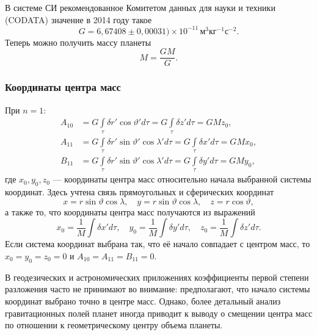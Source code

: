 \documentclass[11pt, a4paper,addpoints]{exam}
\theoremstyle{remark}
\renewcommand{\theta}{\vartheta}
\begin{document}
    В системе СИ рекомендованное Комитетом данных для науки и техники (CODATA) значение в 2014 году\cite{CODATA2014} такое
    \begin{equation*}
        G = 6,67408 \pm 0,00031)\times10^{-11}\,\text{м}^3\text{кг}^{-1}\text{с}^{-2}.
    \end{equation*}
    Теперь можно получить массу планеты
    \begin{equation}
        \label{eq:mass}
        M = \dfrac{GM}{G}.
    \end{equation}

    \subsubsection*{Координаты центра масс}
    При $n = 1$:
    \begin{align*}
        A_{10} &= G \int\limits_\tau \delta r' \cos{\theta'}d\tau =
        G \int\limits_\tau \delta z'd\tau = GMz_0, \\
        A_{11} &= G \int\limits_\tau \delta r' \sin{\theta'}\cos{\lambda'}d\tau = 
        G \int\limits_\tau \delta x'd\tau = GMx_0, \\
        B_{11} &= G \int\limits_\tau \delta r' \sin{\theta'}\cos{\lambda'}d\tau = 
        G \int\limits_\tau \delta y'd\tau = GMy_0,
    \end{align*}
    где $x_0, y_0, z_0$ --- координаты центра масс относительно начала выбранной системы координат. 
    Здесь учтена связь  прямоугольных и сферических координат
    \begin{equation*}
        x = r\sin\theta\cos\lambda, \quad y = r\sin\theta\cos\lambda, \quad z = r\cos\theta,
    \end{equation*}
    а также то, что координаты центра масс получаются из выражений
    \begin{equation*}
        x_0 = \dfrac{1}{M} \int \delta x' d\tau, \quad
        y_0 = \dfrac{1}{M} \int \delta y' d\tau, \quad
        z_0 = \dfrac{1}{M} \int \delta z' d\tau.
    \end{equation*}
    Если система координат выбрана так, что её начало совпадает с центром масс, то $x_0 = y_0 = z_0
    = 0$ и $A_{10} = A_{11} = B_{11} = 0$.

    В геодезических и астрономических приложениях коэффициенты первой степени 
    разложения часто не принимают во внимание: предполагают,
    что начало системы координат выбрано точно в центре масс. Однако, более детальный анализ
    гравитационных полей планет иногда приводит к выводу о смещении центра масс по отношении к
    геометрическому центру объема планеты.
\end{document}
